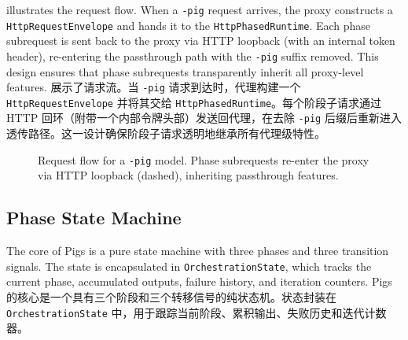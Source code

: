  illustrates the request flow. When a \texttt{-pig} request arrives, the proxy constructs a \texttt{HttpRequestEnvelope} and hands it to the \texttt{HttpPhasedRuntime}. Each phase subrequest is sent back to the proxy via HTTP loopback (with an internal token header), re-entering the passthrough path with the \texttt{-pig} suffix removed. This design ensures that phase subrequests transparently inherit all proxy-level features.
 展示了请求流。当 \texttt{-pig} 请求到达时，代理构建一个 \texttt{HttpRequestEnvelope} 并将其交给 \texttt{HttpPhasedRuntime}。每个阶段子请求通过 HTTP 回环（附带一个内部令牌头部）发送回代理，在去除 \texttt{-pig} 后缀后重新进入透传路径。这一设计确保阶段子请求透明地继承所有代理级特性。

\begin{figure}[t]
\centering
{}
\caption{Request flow for a \texttt{-pig} model. Phase subrequests re-enter the proxy via HTTP loopback (dashed), inheriting passthrough features.}
\label{fig:arch}
\end{figure}
\subsection{Phase State Machine}
\label{sec:state}

The core of Pigs is a pure state machine with three phases and three transition signals. The state is encapsulated in \texttt{OrchestrationState}, which tracks the current phase, accumulated outputs, failure history, and iteration counters.
Pigs 的核心是一个具有三个阶段和三个转移信号的纯状态机。状态封装在 \texttt{OrchestrationState} 中，用于跟踪当前阶段、累积输出、失败历史和迭代计数器。

